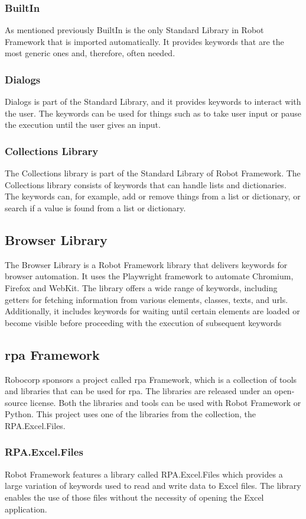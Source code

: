 \subsubsection{BuiltIn}
As mentioned previously BuiltIn is the only Standard Library in Robot Framework that is imported automatically.
It provides keywords that are the most generic ones and, therefore, often needed.
\cite{robotFramework:builtinLibrary}
\subsubsection{Dialogs}
Dialogs is part of the Standard Library, and it provides keywords to interact with the user. The keywords can be used for things such as to take user input or pause the execution until the user gives an input.
\cite{robotFramework:dialogsLibrary}

\subsubsection{Collections Library}
The Collections library is part of the Standard Library of Robot Framework.
The Collections library consists of keywords that can handle lists and dictionaries.
The keywords can, for example, add or remove things from a list or dictionary, or search if a value is found from a list or dictionary.
\cite{robotFramework:collectionsLibrary}

\subsection{Browser Library}
The Browser Library is a Robot Framework library that delivers keywords for browser automation.
It uses the Playwright framework to automate Chromium, Firefox and WebKit.
The library offers a wide range of keywords, including getters for fetching information from various elements, classes, texts, and \gls{url}s.
Additionally, it includes keywords for waiting until certain elements are loaded or become visible before proceeding with the execution of subsequent keywords
\cite{robotFramework:browserLibrary}

\subsection{\gls{rpa} Framework}
Robocorp sponsors a  project called \gls{rpa} Framework, which is a collection of tools and libraries that can be used for \gls{rpa}\cite{robotFramwework:rpaFramework}.
The libraries are released under an open-source license.
Both the libraries and tools can be used with Robot Framework or Python.
This project uses one of the libraries from the collection, the RPA.Excel.Files.
\subsubsection{RPA.Excel.Files}
Robot Framework features a library called RPA.Excel.Files which provides a large variation of keywords used to read and write data to Excel files.
The library enables the use of those files without the necessity of opening the Excel application.
\cite{rpaFramework:excelFiles}

\clearpage %
